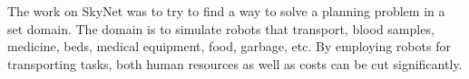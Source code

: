 \documentclass[Main]{subfiles}
\begin{document}
The work on SkyNet was to try to find a way to solve a planning problem in a set domain. The domain is to simulate robots that transport, blood samples, medicine, beds, medical equipment, food, garbage, etc. By employing robots for transporting tasks, both human resources as well as costs can be cut significantly.
\end{document}
